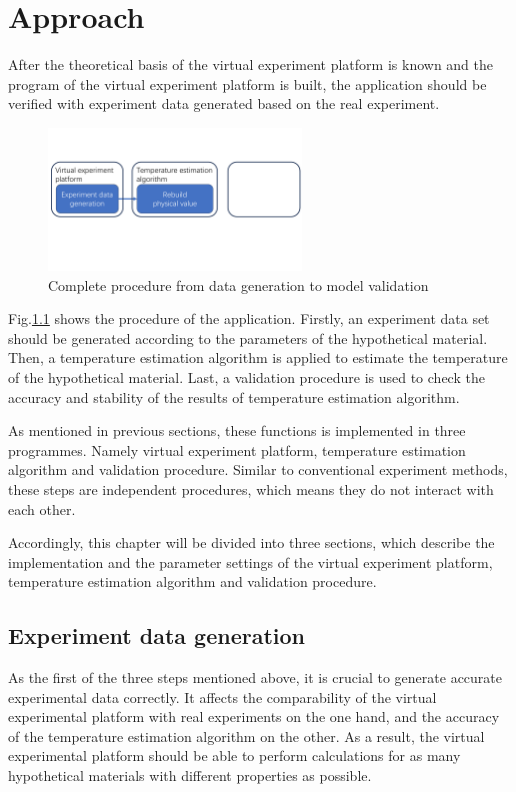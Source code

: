\chapter{Approach}

After the theoretical basis of the virtual experiment platform is known and 
the program of the virtual experiment platform is built, the application should be 
verified with experiment data generated based on the real experiment.


\begin{figure}[htbp]
    \centering
    \includegraphics[width=0.6\textwidth]{figures/application_procedure_1.pdf}
    \caption{Complete procedure from data generation to model validation}
    \label{fig: application_procedure}
\end{figure}


Fig.\ref{fig: application_procedure} shows the procedure of the application.
Firstly, an experiment data set should be generated according to the parameters of the 
hypothetical material. Then, a temperature estimation algorithm is applied to 
estimate the temperature of the hypothetical material. Last, a validation procedure 
is used to check the accuracy and stability of the results of 
temperature estimation algorithm.


As mentioned in previous sections, these functions is implemented in three 
programmes. Namely virtual experiment platform, temperature estimation algorithm
and validation procedure. Similar to conventional experiment methods, these
steps are independent procedures, which means they do not interact with 
each other. 


Accordingly, this chapter will be divided into three sections, which describe 
the implementation and the parameter settings of the virtual experiment platform, 
temperature estimation algorithm and validation procedure.


\section{Experiment data generation}
As the first of the three steps mentioned above, it is crucial to generate 
accurate experimental data correctly. It affects the comparability of the 
virtual experimental platform with real experiments on the one hand, and 
the accuracy of the temperature estimation algorithm on the other. As a 
result, the virtual experimental platform should be able to perform 
calculations for as many hypothetical materials with different properties 
as possible.


